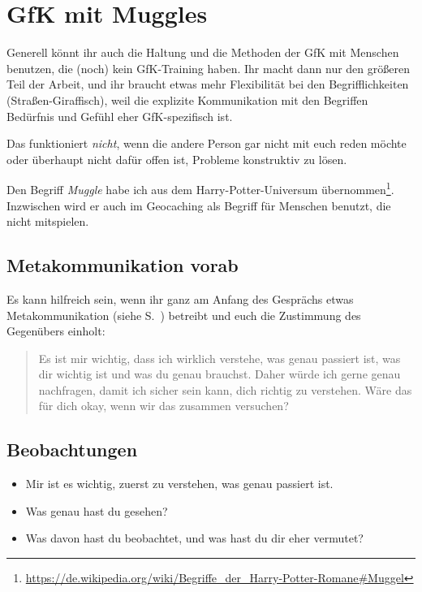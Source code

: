 \section{GfK mit Muggles}
\label{gfk-mit-muggles}

Generell könnt ihr auch die Haltung und die Methoden der GfK mit Menschen benutzen, die (noch) kein GfK-Training haben. Ihr macht dann nur den größeren Teil der Arbeit, und ihr braucht etwas mehr Flexibilität bei den Begrifflichkeiten (\glqq Straßen-Giraffisch\grqq), weil die explizite Kommunikation mit den Begriffen \glqq Bedürfnis\grqq{} und \glqq Gefühl\grqq{} eher GfK-spezifisch ist.

Das funktioniert \emph{nicht}, wenn die andere Person gar nicht mit euch reden möchte oder überhaupt nicht dafür offen ist, Probleme konstruktiv zu lösen.

Den Begriff \emph{Muggle} habe ich aus dem Harry-Potter-Universum übernommen\footnote{\url{https://de.wikipedia.org/wiki/Begriffe_der_Harry-Potter-Romane\#Muggel}}. Inzwischen wird er auch im Geocaching als Begriff für Menschen benutzt, die nicht mitspielen.


\subsection{Metakommunikation vorab}

Es kann hilfreich sein, wenn ihr ganz am Anfang des Gesprächs etwas Metakommunikation (siehe S.~\pageref{metakommunikation}) betreibt und euch die Zustimmung des Gegenübers einholt:

\begin{quote}
  Es ist mir wichtig, dass ich wirklich verstehe, was genau passiert ist, was dir wichtig ist und was du genau brauchst. Daher würde ich gerne genau nachfragen, damit ich sicher sein kann, dich richtig zu verstehen. Wäre das für dich okay, wenn wir das zusammen versuchen?
\end{quote}


\subsection{Beobachtungen}

\begin{itemize}
  \item Mir ist es wichtig, zuerst zu verstehen, was genau passiert ist.
  \item Was genau hast du gesehen?
  \item Was davon hast du beobachtet, und was hast du dir eher vermutet?
\end{itemize}


